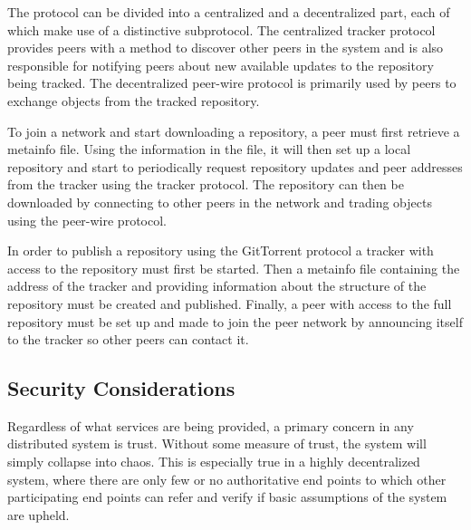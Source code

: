 The protocol can be divided into a centralized and a decentralized
part, each of which make use of a distinctive subprotocol. The
centralized tracker protocol provides peers with a method to discover
other peers in the system and is also responsible for notifying peers
about new available updates to the repository being tracked. The
decentralized peer-wire protocol is primarily used by peers to exchange objects
from the tracked repository.


To join a network and start downloading a repository, a peer must
first retrieve a metainfo file. Using the information in the file, it
will then set up a local repository and start to periodically request
repository updates and peer addresses from the tracker using the
tracker protocol. The repository can then be downloaded by connecting
to other peers in the network and trading objects using the peer-wire
protocol.

In order to publish a repository using the GitTorrent protocol a
tracker with access to the repository must first be started. Then a
metainfo file containing the address of the tracker and providing
information about the structure of the repository must be created and
published. Finally, a peer with access to the full repository must be
set up and made to join the peer network by announcing itself to the
tracker so other peers can contact it.

\subsection{Security Considerations}





Regardless of what services are being provided, a primary concern in
any distributed system is trust. Without some measure of trust, the
system will simply collapse into chaos. This is especially true in a highly
decentralized system, where there are only few or no authoritative end
points to which other participating end points can refer and verify
if basic assumptions of the system are upheld.

